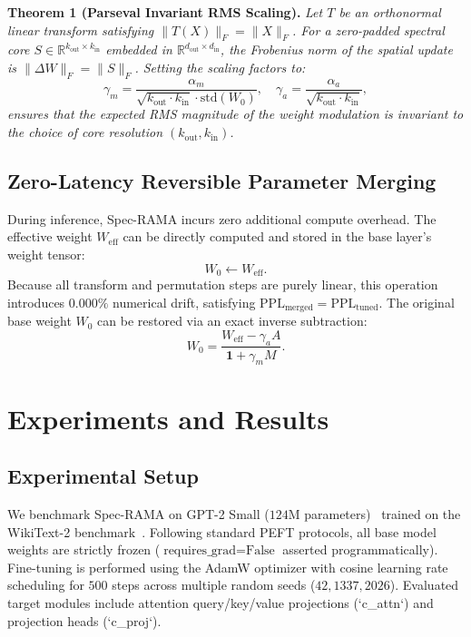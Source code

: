 \documentclass{article}
\begin{document}
\textbf{Theorem 1 (Parseval Invariant RMS Scaling).} \textit{Let $T$ be an orthonormal linear transform satisfying $\|T(X)\|_F = \|X\|_F$. For a zero-padded spectral core $S \in \mathbb{R}^{k_{\text{out}} \times k_{\text{in}}}$ embedded in $\mathbb{R}^{d_{\text{out}} \times d_{\text{in}}}$, the Frobenius norm of the spatial update is $\|\Delta W\|_F = \|S\|_F$. Setting the scaling factors to:
\begin{equation}
\gamma_m = \frac{\alpha_m}{\sqrt{k_{\text{out}} \cdot k_{\text{in}}} \cdot \text{std}(W_0)}, \quad \gamma_a = \frac{\alpha_a}{\sqrt{k_{\text{out}} \cdot k_{\text{in}}}},
\end{equation}
ensures that the expected RMS magnitude of the weight modulation is invariant to the choice of core resolution $(k_{\text{out}}, k_{\text{in}})$.}

\subsection{Zero-Latency Reversible Parameter Merging}

During inference, Spec-RAMA incurs zero additional compute overhead. The effective weight $W_{\text{eff}}$ can be directly computed and stored in the base layer's weight tensor:
\begin{equation}
W_0 \leftarrow W_{\text{eff}}.
\end{equation}
Because all transform and permutation steps are purely linear, this operation introduces $0.000\%$ numerical drift, satisfying $\text{PPL}_{\text{merged}} = \text{PPL}_{\text{tuned}}$. The original base weight $W_0$ can be restored via an exact inverse subtraction:
\begin{equation}
W_0 = \frac{W_{\text{eff}} - \gamma_a A}{\mathbf{1} + \gamma_m M}.
\end{equation}

\section{Experiments and Results}

\subsection{Experimental Setup}

We benchmark Spec-RAMA on GPT-2 Small ($124$M parameters)~\cite{radford2019gpt2} trained on the WikiText-2 benchmark~\cite{merity2016wikitext}. Following standard PEFT protocols, all base model weights are strictly frozen ($\text{requires\_grad}=\text{False}$ asserted programmatically). Fine-tuning is performed using the AdamW optimizer with cosine learning rate scheduling for $500$ steps across multiple random seeds ($42, 1337, 2026$). Evaluated target modules include attention query/key/value projections (`c\_attn`) and projection heads (`c\_proj`).
\end{document}
